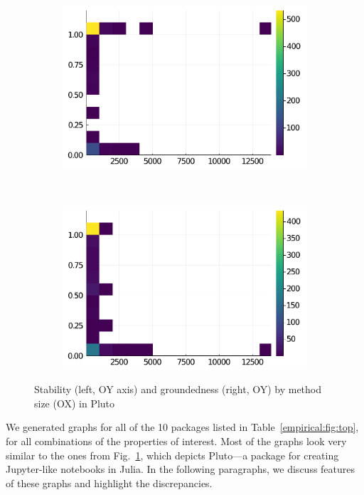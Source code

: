 \documentclass[oneside,openright,titlepage,numbers=noenddot,%
headinclude,footinclude,cleardoublepage=empty,abstract=on,
BCOR=5mm,paper=a4,fontsize=11pt,
dvipsnames
]{scrreprt}
\begin{document}
\begin{figure}[h]
\centering
     \begin{subfigure}[b]{0.35\textwidth}
       \includegraphics[width=\textwidth]{figs/Pluto-size-vs-stable.pdf}
     \end{subfigure}
     \ \ \
     \begin{subfigure}[b]{0.35\textwidth}
       \includegraphics[width=\textwidth]{figs/Pluto-size-vs-grounded.pdf}
     \end{subfigure}
\caption{Stability (left, OY axis) and groundedness (right, OY) by method size (OX) in Pluto}%
\label{figs:size:Pluto:main}
\end{figure}

We generated graphs for all of the 10 packages listed in
Table~\ref{empirical:fig:top}, for all combinations of the properties of
interest.
Most of the graphs look very similar to the ones from
Fig.~\ref{figs:size:Pluto:main}, which depicts Pluto---a package for creating
Jupyter-\hspace{0pt}like notebooks in Julia. In the following paragraphs, we
discuss features of these graphs and highlight the discrepancies.
\end{document}
